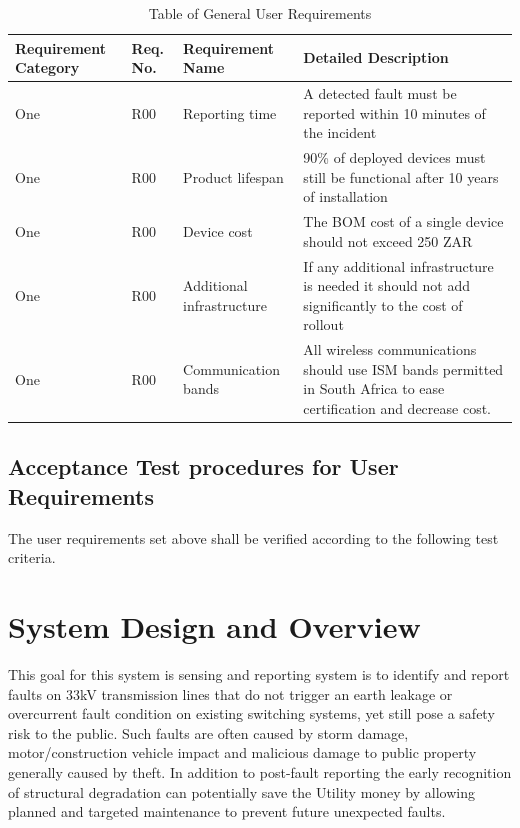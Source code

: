 \documentclass[12pt]{article}
\begin{document}
\begin{center}
  \begin{table}[htp!]
    \caption{Table of General User Requirements}
    
    \hskip-1.2cm\begin{tabular}{|p{3cm}|p{2cm}|p{4cm}|p{9cm}|}
        \hline
        \textbf{Requirement Category} & \textbf{Req. No.} & \textbf{Requirement Name} & \textbf{Detailed Description} \\
        \hline
        One & R00 & Reporting time & A detected fault must be reported within 10 minutes of the incident \\\hline
        One & R00 & Product lifespan & 90\% of deployed devices must still be functional after 10 years of installation \\\hline
        One & R00 & Device cost & The BOM cost of a single device should not exceed 250 ZAR \\\hline
        One & R00 & Additional infrastructure & If any additional infrastructure is needed it should not add significantly
        to the cost of rollout \\\hline
        One & R00 & Communication bands & All wireless communications should use ISM bands permitted in South Africa
        to ease certification and decrease cost. \\\hline
  
    \end{tabular}    
  
  \label{tab:usreq}
  \end{table}
\end{center}

\subsection{Acceptance Test procedures for User Requirements}
The user requirements set above shall be verified according to the following test criteria.


\section{System Design and Overview}

This goal for this system is sensing and reporting system is to identify and report faults on 33kV transmission
lines that do not trigger an earth leakage or overcurrent fault condition on existing switching systems, yet
still pose a safety risk to the public. Such faults are often caused by storm damage, motor/construction vehicle
impact and malicious damage to public property generally caused by theft. In addition to post-fault reporting the
early recognition of structural degradation can potentially save the Utility money by allowing planned and
targeted maintenance to prevent future unexpected faults. 
\end{document}

